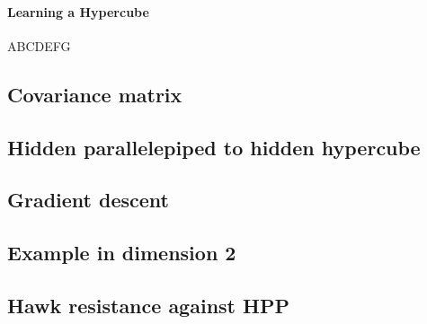 \paragraph{Learning a Hypercube}
ABCDEFG
\subsection{Covariance matrix}
\subsection{Hidden parallelepiped to hidden hypercube}
\subsection{Gradient descent}
\subsection{Example in dimension 2}
\subsection{Hawk resistance against HPP}
